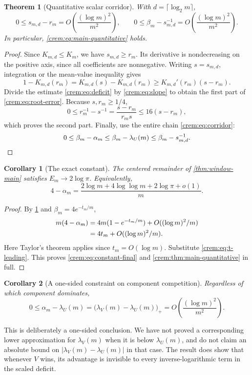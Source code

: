 \documentclass[11pt,a4paper]{article}
\newtheorem{theorem}{Theorem}[section]
\newtheorem{corollary}[corollary]{Corollary}
\theoremstyle{definition}\newaliascnt{definition}{theorem}
\theoremstyle{remark}\newaliascnt{remark}{theorem}
\begin{document}
\begin{theorem}[Quantitative scalar corridor]\label{crem:thm:corridor-quantitative}
With $d=\lceil\log_2m\rceil$,
\begin{equation}
 0\le s_{m,d}-r_m
    =O\!\left(\frac{(\log m)^2}{m^2}\right),
 \qquad
 0\le\beta_m-s_{m,d}^{-1}
    =O\!\left(\frac{(\log m)^2}{m^2}\right).
 \label{crem:eq:root-error}
\end{equation}
In particular, \eqref{crem:eq:main-quantitative} holds.
\end{theorem}
\begin{proof}
Since $K_{m,d}\le K_m$, we have $s_{m,d}\ge r_m$. Its derivative is
nondecreasing on the positive axis, since all coefficients are nonnegative.
Writing $s=s_{m,d}$, integration or the mean-value inequality gives
\[
 1-K_{m,d}(r_m)
 =K_{m,d}(s)-K_{m,d}(r_m)
 \ge K_{m,d}'(r_m)(s-r_m).
\]
Divide the estimate \eqref{crem:eq:deficit} by \eqref{crem:eq:slope} to
obtain the first part of \eqref{crem:eq:root-error}. Because $s,r_m\ge1/4$,
\[
 0\le r_m^{-1}-s^{-1}
 =\frac{s-r_m}{r_ms}\le16(s-r_m),
\]
which proves the second part. Finally, use the entire chain
\eqref{crem:eq:corridor}:
\[
 0\le\beta_m-\alpha_m
 \le\beta_m-\lambda_U(m)
 \le\beta_m-s_{m,d}^{-1}.
 \qedhere
\]
\end{proof}

\begin{corollary}[The exact constant]\label{crem:cor:constant}
The centered remainder of \cref{thm:window-main} satisfies $E_m\to2\log\pi$.
Equivalently,
\begin{equation}
 4-\alpha_m
 =\frac{2\log m+4\log\log m+2\log\pi+o(1)}m.
 \label{crem:eq:constant-final}
\end{equation}
\end{corollary}
\begin{proof}
By \cref{crem:thm:corridor-quantitative} and $\beta_m=4e^{-t_m/m}$,
\begin{align}
 m(4-\alpha_m)
 &=4m(1-e^{-t_m/m})+O((\log m)^2/m)\notag\\
 &=4t_m+O((\log m)^2/m).
 \label{crem:eq:transfer}
\end{align}
Here Taylor's theorem applies since $t_m=O(\log m)$. Substitute
\eqref{crem:eq:t-leading}. This proves \eqref{crem:eq:constant-final} and
\cref{crem:thm:main-quantitative} in full.
\end{proof}

\begin{corollary}[A one-sided constraint on component competition]
\label{crem:cor:component-gap}
Regardless of which component dominates,
\begin{equation}
 0\le\alpha_m-\lambda_U(m)
   =\bigl(\lambda_V(m)-\lambda_U(m)\bigr)_+
   =O\!\left(\frac{(\log m)^2}{m^2}\right).
 \label{crem:eq:component-gap}
\end{equation}
\end{corollary}
This is deliberately a one-sided conclusion. We have not proved a
corresponding lower approximation for $\lambda_V(m)$ when it is below
$\lambda_U(m)$, and do not claim an absolute bound on
$|\lambda_V(m)-\lambda_U(m)|$ in that case. The result does show that
whenever $V$ wins, its advantage is invisible to every inverse-logarithmic
term in the scaled deficit.
\end{document}
